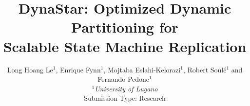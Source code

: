 \documentclass[10pt,twocolumn]{article}
\newcommand{\dynastar}{\mbox{DynaStar}\xspace}
\begin{document}
\title{\dynastar: Optimized Dynamic Partitioning for\\ Scalable State Machine Replication}
\author{Long Hoang Le$^1$, Enrique Fynn$^1$, Mojtaba Eslahi-Kelorazi$^1$, Robert Soul\'{e}$^1$ and Fernando Pedone$^1$ \\
\small {\em  $^1$University of Lugano} \\ [2mm]
\small Submission Type: Research
}
\date{}
\maketitle

\thispagestyle{empty}

\begin{abstract}
  
\end{abstract}










%



%




\end{document}
